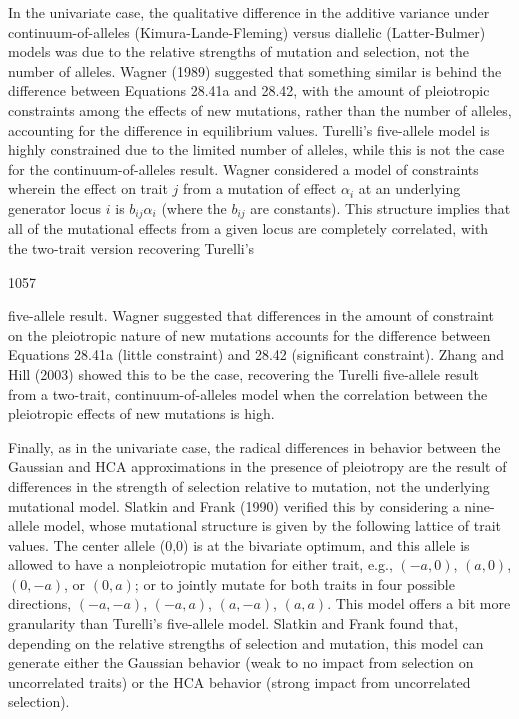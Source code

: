 \documentclass{article}
\begin{document}
In the univariate case, the qualitative difference in the additive variance under continuum-of-alleles (Kimura-Lande-Fleming) versus diallelic (Latter-Bulmer) models was due to the relative strengths of mutation and selection, not the number of alleles. Wagner (1989) suggested that something similar is behind the difference between Equations 28.41a and 28.42, with the amount of pleiotropic constraints among the effects of new mutations, rather than the number of alleles, accounting for the difference in equilibrium values. Turelli's five-allele model is highly constrained due to the limited number of alleles, while this is not the case for the continuum-of-alleles result. Wagner considered a model of constraints wherein the effect on trait $j$ from a mutation of effect $\alpha_{i}$ at an underlying generator locus $i$ is $b_{ij} \alpha_{i}$ (where the $b_{ij}$ are constants). This structure implies that all of the mutational effects from a given locus are completely correlated, with the two-trait version recovering Turelli's

1057

five-allele result. Wagner suggested that differences in the amount of constraint on the pleiotropic nature of new mutations accounts for the difference between Equations 28.41a (little constraint) and 28.42 (significant constraint). Zhang and Hill (2003) showed this to be the case, recovering the Turelli five-allele result from a two-trait, continuum-of-alleles model when the correlation between the pleiotropic effects of new mutations is high.

Finally, as in the univariate case, the radical differences in behavior between the Gaussian and HCA approximations in the presence of pleiotropy are the result of differences in the strength of selection relative to mutation, not the underlying mutational model. Slatkin and Frank (1990) verified this by considering a nine-allele model, whose mutational structure is given by the following lattice of trait values. The center allele (0,0) is at the bivariate optimum, and this allele is allowed to have a nonpleiotropic mutation for either trait, e.g.,  $ (-a,0) $,  $ (a,0) $,  $ (0,-a) $, or  $ (0,a) $; or to jointly mutate for both traits in four possible directions,  $ (-a,-a) $,  $ (-a,a) $,  $ (a,-a) $,  $ (a,a) $. This model offers a bit more granularity than Turelli's five-allele model. Slatkin and Frank found that, depending on the relative strengths of selection and mutation, this model can generate either the Gaussian behavior (weak to no impact from selection on uncorrelated traits) or the HCA behavior (strong impact from uncorrelated selection).
\end{document}
